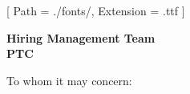 


\renewcommand{\photo}[2]{}

\geometry{
  left=2cm,
  right=2cm,
  top=2cm,
  bottom=2cm
}



\makecvheader

\setmainfont{NotoSans-Regular}[
  Path = ./fonts/,
  Extension = .ttf
]

\vspace{1cm}
\indent\textbf{Hiring Management Team}\\
\indent\textbf{PTC}

\vspace{0.5cm}

\noindent To whom it may concern:

\vspace{0.5cm}

